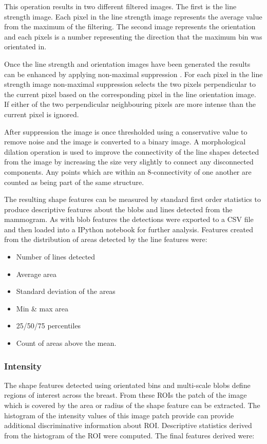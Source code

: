 This operation results in two different filtered images. The first is the line strength image. Each pixel in the line strength image represents the average value from the maximum of the filtering. The second image represents the orientation and each pixels is a number representing the direction that the maximum bin was orientated in.

Once the line strength and orientation images have been generated the results can be enhanced by applying non-maximal suppression \cite{sonka2014image}. For each pixel in the line strength image non-maximal suppression selects the two pixels perpendicular to the current pixel based on the corresponding pixel in the line orientation image. If either of the two perpendicular neighbouring pixels are more intense than the current pixel is ignored. 

After suppression the image is once thresholded using a conservative value to remove noise and the image is converted to a binary image. A morphological dilation operation is used to improve the connectivity of the line shapes detected from the image by increasing the size very slightly to connect any disconnected components. Any points which are within an 8-connectivity of one another are counted as being part of the same structure.

The resulting shape features can be measured by standard first order statistics to produce descriptive features about the blobs and lines detected from the mammogram. As with blob features the detections were exported to a CSV file and then loaded into a IPython notebook for further analysis. Features created from the distribution of areas detected by the line features were:

\begin{itemize}
	\item Number of lines detected
	\item Average area
	\item Standard deviation of the areas
	\item Min \& max area
	\item 25/50/75 percentiles
	\item Count of areas above the mean.
\end{itemize}

\subsubsection{Intensity}
The shape features detected using orientated bins and multi-scale blobs define regions of interest across the breast. From these ROIs the patch of the image which is covered by the area or radius of the shape feature can be extracted. The histogram of the intensity values of this image patch provide can provide additional discriminative information about ROI. Descriptive statistics derived from the histogram of the ROI were computed. The final features derived were:

